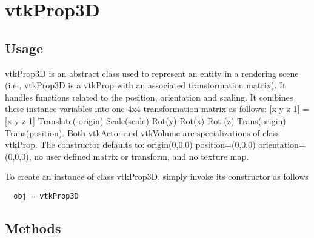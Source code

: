 \section{vtkProp3D}

\subsection{Usage}

 vtkProp3D is an abstract class used to represent an entity in a rendering
 scene (i.e., vtkProp3D is a vtkProp with an associated transformation
 matrix).  It handles functions related to the position, orientation and
 scaling. It combines these instance variables into one 4x4 transformation
 matrix as follows: [x y z 1] = [x y z 1] Translate(-origin) Scale(scale)
 Rot(y) Rot(x) Rot (z) Trans(origin) Trans(position). Both vtkActor and
 vtkVolume are specializations of class vtkProp.  The constructor defaults
 to: origin(0,0,0) position=(0,0,0) orientation=(0,0,0), no user defined 
 matrix or transform, and no texture map.

To create an instance of class vtkProp3D, simply
invoke its constructor as follows
\begin{verbatim}
  obj = vtkProp3D
\end{verbatim}
\subsection{Methods}

